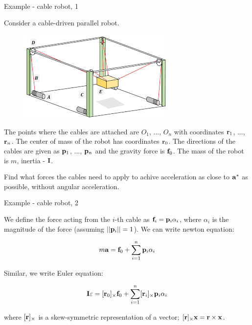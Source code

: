 \documentclass{beamer}
\begin{document}
\begin{frame}{Example - cable robot, 1}
	\begin{flushleft}
		
		Consider a cable-driven parallel robot.
		
		\begin{figure}
			\centering
			\includegraphics[width=0.5\linewidth]{"cable robot"}
		\end{figure}
		
		
		The points where the cables are attached are $O_1$, ..., $O_n$ with coordinates $\mathbf{r}_1$, ..., $\mathbf{r}_n$. The center of mass of the robot has coordinates $\mathbf{r}_0$. The directions of the cables are given as $\mathbf{p}_1$, ..., $\mathbf{p}_n$ and the gravity force is $\mathbf{f}_0$. The mass of the robot is $m$, inertia - $\mathbf{I}$.
		
		\bigskip
		
		Find what forces the cables need to apply to achive acceleration as close to $\mathbf{a}^*$ as possible, without angular acceleration.
		
	\end{flushleft}
\end{frame}



\begin{frame}{Example - cable robot, 2}
	\begin{flushleft}
		
		We define the force acting from the $i$-th cable as $ \mathbf{f}_i  = \mathbf{p}_i \alpha_i$, where $\alpha_i$ is the magnitude of the force (assuming $||\mathbf{p}_i|| = 1$). We can write newton equation:
		
		\begin{align}
			m \mathbf{a} = \mathbf{f}_0 + \sum_{i = 1}^{n} \mathbf{p}_i \alpha_i
		\end{align}
		
		Similar, we write Euler equation:
		
		\begin{align}
			\mathbf{I}\varepsilon = [\mathbf{r}_0]_\times \mathbf{f}_0 + \sum_{i = 1}^{n} [\mathbf{r}_i]_\times \mathbf{p}_i \alpha_i
		\end{align}
		
		where $[\mathbf{r}]_\times$ is a skew-symmetric representation of a vector; $[\mathbf{r}]_\times \mathbf{x} = \mathbf{r} \times \mathbf{x}$.
		
	\end{flushleft}
\end{frame}
\end{document}
